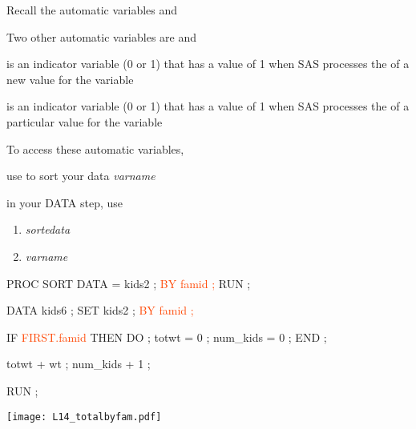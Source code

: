 \begin{frame}
\bi
\item Recall the automatic variables  and \\
\item Two other automatic variables are  and \\
	\bi
	\item {} is an indicator variable (0 or 1) that has a value of 1 when SAS processes the  of a new value for the variable \\
	\item {} is an indicator variable (0 or 1) that has a value of 1 when SAS processes the  of a particular value for the variable \\
	\ei
\item To access these automatic variables,
\bi
\item use  to sort your data  \emph{varname}
\item in your DATA step, use
\begin{enumerate}
\item {} \emph{sortedata} \ttt{;}
\item {} \emph{varname} \ttt{;}
\end{enumerate}
\ei
\ei
\end{frame}

\begin{frame}[fragile]
\footnotesize
\begin{code}{.0}
PROC SORT DATA = kids2 ;
   \textcolor{OrangeRed}{BY famid ;}
RUN ;

DATA kids6 ;
   SET kids2 ;
   \textcolor{OrangeRed}{BY famid ;}

   IF \textcolor{OrangeRed}{FIRST.famid} THEN DO ;
      totwt = 0 ;
      num_kids = 0 ;
   END ;

   totwt + wt ;
   num_kids + 1 ;

RUN ;
\end{code}
\emp
{} \hspace{0.05in} \emp
{} 
\texttt{[image: L14\_totalbyfam.pdf]}
\emp
\end{frame}



